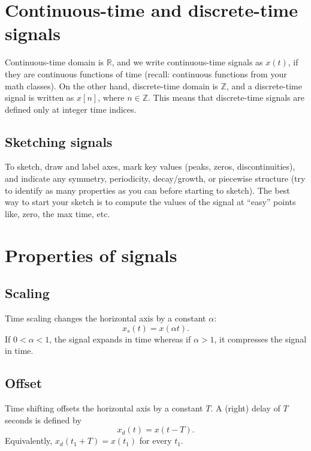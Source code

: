 
\section{Continuous-time and discrete-time signals}
Continuous-time domain is $\mathbb{R}$, and we write continuous-time signals as $x(t)$, if they are continuous functions of time (recall: continuous functions from your math classes). On the other hand, discrete-time domain is $\mathbb{Z}$, and a discrete-time signal is written as $x[n]$, where $n \in \mathbb{Z}$. This means that discrete-time signals are defined only at integer time indices.
\subsection{Sketching signals}
To sketch, draw and label axes, mark key values (peaks, zeros, discontinuities), and indicate any symmetry, periodicity, decay/growth, or piecewise structure (try to identify as many properties as you can before starting to sketch). The best way to start your sketch is to compute the values of the signal at ``easy'' points like, zero, the max time, etc.  

\section{Properties of signals}
\subsection{Scaling}
Time scaling changes the horizontal axis by a constant $\alpha$:
\[
x_s(t)=x(\alpha t).
\]
If $0<\alpha<1$, the signal expands in time whereas if $\alpha>1$, it compresses the signal in time.

\subsection{Offset}
Time shifting offsets the horizontal axis by a constant $T$.  A (right) delay of $T$ seconds is defined by
\[
x_d(t)=x(t-T).
\]
Equivalently, $x_d(t_1+T)=x(t_1)$ for every $t_1$.

